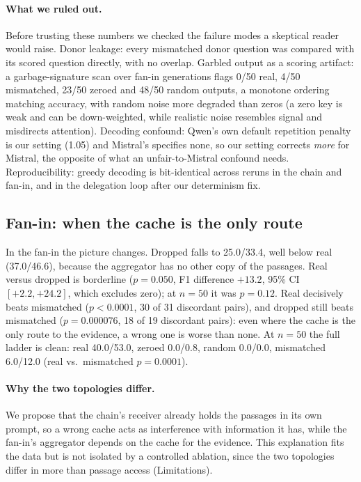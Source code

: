 \documentclass[11pt]{article}
\begin{document}
\paragraph{What we ruled out.} Before trusting these numbers we checked
the failure modes a skeptical reader would raise. Donor leakage: every
mismatched donor question was compared with its scored question directly,
with no overlap. Garbled output as a scoring artifact: a garbage-signature
scan over fan-in generations flags 0/50 real, 4/50 mismatched, 23/50
zeroed and 48/50 random outputs, a monotone ordering matching accuracy, with
random noise more degraded than zeros (a zero key is weak and can be
down-weighted, while realistic noise resembles signal and misdirects
attention). Decoding confound: Qwen's own default repetition penalty is our
setting (1.05) and Mistral's specifies none, so our setting corrects
\emph{more} for Mistral, the opposite of what an unfair-to-Mistral confound
needs. Reproducibility: greedy decoding is bit-identical across reruns in
the chain and fan-in, and in the delegation loop after our determinism fix.

\subsection{Fan-in: when the cache is the only route}

In the fan-in the picture changes. Dropped falls to 25.0/33.4, well below
real (37.0/46.6), because the aggregator has no other copy of the
passages. Real versus dropped is borderline ($p=0.050$, F1 difference
$+13.2$, 95\% CI $[+2.2,+24.2]$, which excludes zero); at $n{=}50$ it was
$p=0.12$. Real decisively beats mismatched ($p<0.0001$, 30 of 31
discordant pairs), and dropped still beats mismatched ($p=0.000076$, 18
of 19 discordant pairs): even where the cache is the only route to the
evidence, a wrong one is worse than none. At $n{=}50$ the full ladder is
clean: real 40.0/53.0, zeroed 0.0/0.8, random 0.0/0.0, mismatched
6.0/12.0 (real vs.\ mismatched $p=0.0001$).

\paragraph{Why the two topologies differ.} We propose that the chain's
receiver already holds the passages in its own prompt, so a wrong cache
acts as interference with information it has, while the fan-in's
aggregator depends on the cache for the evidence. This explanation fits
the data but is not isolated by a controlled ablation, since the two
topologies differ in more than passage access (Limitations).
\end{document}
